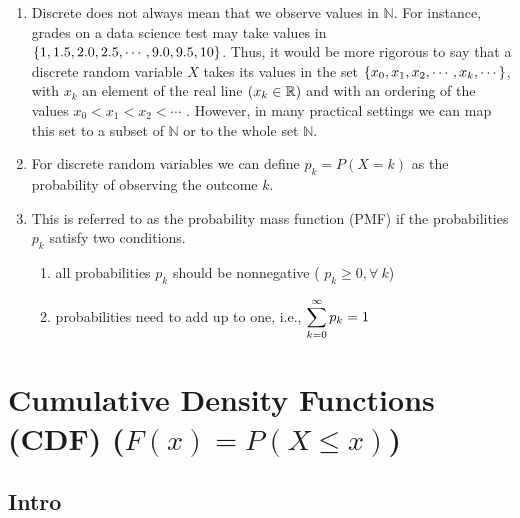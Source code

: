 \begin{enumerate}
    \item Discrete does not always mean that we observe values in $\mathbb{N}$.
    For instance, grades on a data science test may take values in $\left\{1, 1.5, 2.0, 2.5, \cdots , 9.0, 9.5, 10\right\}$.
    Thus, it would be more rigorous to say that a discrete random variable $X$ takes its values in the set $\left\{x_0, x_1, x_2, \cdots , x _k , \cdots\right\}$, with $x _k$ an element of the real line $(x _k \in \mathbb{R})$ and with an ordering of the values $x_0 < x_1 < x_2 < \cdots$ .
    However, in many practical settings we can map this set to a subset of $\mathbb{N}$ or to the whole set $\mathbb{N}$.
    \hfill \cite{statistics/book/Statistics-for-Data-Scientists/Maurits-Kaptein}

    \item For discrete random variables we can define $p _k = P(X = k)$ as the probability of observing the outcome $k$.
    \hfill \cite{statistics/book/Statistics-for-Data-Scientists/Maurits-Kaptein}

    \item This is referred to as the probability mass function (PMF) if the probabilities $p _k$ satisfy two conditions.
    \hfill \cite{statistics/book/Statistics-for-Data-Scientists/Maurits-Kaptein}
    \begin{enumerate}
        \item all probabilities $p _k$ should be nonnegative ( $p _k \geq 0, \forall\ k$)
        \hfill \cite{statistics/book/Statistics-for-Data-Scientists/Maurits-Kaptein}

        \item probabilities need to add up to one, i.e., $\displaystyle\sum^{\infty}_{k=0} p _k = 1$
        \hfill \cite{statistics/book/Statistics-for-Data-Scientists/Maurits-Kaptein}
    \end{enumerate}
\end{enumerate}







\section{Cumulative Density Functions (CDF) ($F(x) = P(X \leq x)$)}

\subsection{Intro}

